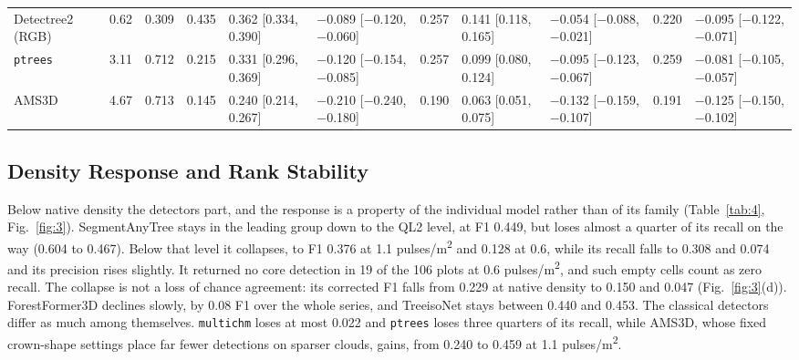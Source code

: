 \documentclass[journal]{IEEEtran}
\begin{document}
\begin{table}[!tp]
\begin{tabularx}{\textwidth}{LLllLLlLLlL}
Detectree2 (RGB) & 0.62 & 0.309 & 0.435 & 0.362 [0.334, 0.390] & $-$0.089 [$-$0.120, $-$0.060] & 0.257 & 0.141 [0.118, 0.165] & $-$0.054 [$-$0.088, $-$0.021] & 0.220 & $-$0.095 [$-$0.122, $-$0.071] \\
\texttt{ptrees} & 3.11 & 0.712 & 0.215 & 0.331 [0.296, 0.369] & $-$0.120 [$-$0.154, $-$0.085] & 0.257 & 0.099 [0.080, 0.124] & $-$0.095 [$-$0.123, $-$0.067] & 0.259 & $-$0.081 [$-$0.105, $-$0.057] \\
AMS3D & 4.67 & 0.713 & 0.145 & 0.240 [0.214, 0.267] & $-$0.210 [$-$0.240, $-$0.180] & 0.190 & 0.063 [0.051, 0.075] & $-$0.132 [$-$0.159, $-$0.107] & 0.191 & $-$0.125 [$-$0.150, $-$0.102] \\
\hline
\end{tabularx}
\end{table}

\subsection{Density Response and Rank Stability}\label{sec:5.2}

Below native density the detectors part, and the response is a property of the
individual model rather than of its family (Table~\ref{tab:4}, Fig.~\ref{fig:3}). SegmentAnyTree
stays in the leading group down to the QL2 level, at F1 0.449, but loses almost
a quarter of its recall on the way (0.604 to 0.467). Below that level it
collapses, to F1 0.376 at 1.1 pulses/m\textsuperscript{2} and 0.128 at 0.6, while its recall falls
to 0.308 and 0.074 and its precision rises slightly. It returned no core
detection in 19 of the 106 plots at 0.6 pulses/m\textsuperscript{2}, and such empty cells count as
zero recall. The collapse is not a loss of chance agreement: its corrected F1
falls from 0.229 at native density to 0.150 and 0.047 (Fig.~\ref{fig:3}(d)). ForestFormer3D
declines slowly, by 0.08 F1 over the whole series, and TreeisoNet stays between
0.440 and 0.453. The classical detectors differ as much among themselves.
\texttt{multichm} loses at most 0.022 and \texttt{ptrees} loses three quarters of its recall,
while AMS3D, whose fixed crown-shape settings place far fewer detections on
sparser clouds, gains, from 0.240 to 0.459 at 1.1 pulses/m\textsuperscript{2}.
\end{document}
